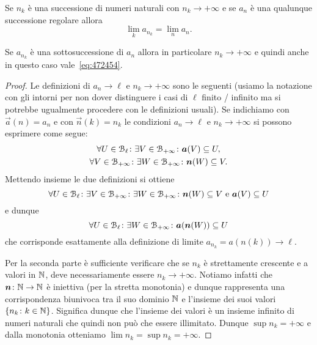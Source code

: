 \begin{theorem}
Se $n_k$ è una successione di numeri naturali con $n_k\to +\infty$
e se $a_n$ è una qualunque successione regolare
allora
\begin{equation}\label{eq:472454}
  \lim_k a_{n_k} = \lim_n a_n.
\end{equation}

Se $a_{n_k}$ è una sottosuccessione di $a_n$ allora in particolare $n_k\to +\infty$
e quindi anche in questo caso vale~\eqref{eq:472454}.
\end{theorem}
%
\begin{proof}
Le definizioni di $a_n \to \ell$ e $n_k \to +\infty$ sono le seguenti
(usiamo la notazione con gli intorni per non dover distinguere
i casi di $\ell$ finito / infinito ma si potrebbe ugualmente
procedere con le definizioni usuali).
Se indichiamo con $\vec a(n)=a_n$ e con $\vec n(k)=n_k$
le condizioni  $a_n\to \ell$ e $n_k\to +\infty$ si possono
esprimere come segue:
\begin{gather*}
 \forall U \in \mathcal B_\ell \colon \exists V \in \mathcal B_{+\infty} \colon
  \boldsymbol a (V) \subseteq U,\\
 \forall V \in \mathcal B_{+\infty} \colon \exists W \in \mathcal B_{+\infty} \colon
  \boldsymbol n(W) \subseteq V.
\end{gather*}
Mettendo insieme le due definizioni si ottiene
\[
  \forall U \in \mathcal B_\ell \colon
  \exists V \in \mathcal B_{+\infty} \colon
  \exists W \in \mathcal B_{+\infty} \colon
  \boldsymbol n(W) \subseteq V \text{ e }
  \boldsymbol a(V) \subseteq U
\]
e dunque
\[
  \forall U \in \mathcal B_\ell \colon \exists W \in \mathcal B_{+\infty} \colon
  \boldsymbol a(\boldsymbol n(W)) \subseteq U
\]
che corrisponde esattamente alla definizione di limite $a_{n_k} = a(n(k)) \to \ell$.

Per la seconda parte è sufficiente verificare che se $n_k$
è strettamente crescente
e a valori in $\mathbb N$, deve necessariamente essere $n_k\to +\infty$.
Notiamo infatti che $\boldsymbol n\colon \mathbb N\to \mathbb N$
è iniettiva (per la stretta monotonia) e dunque rappresenta una
corrispondenza biunivoca tra il suo dominio $\mathbb N$ e l'insieme dei
suoi valori ${\left\{ n_k \colon k \in \mathbb N \right\}}$. Significa dunque che l'insieme
dei valori è un insieme infinito di numeri naturali che quindi non può che
essere illimitato. Dunque $\sup n_k = +\infty$ e dalla monotonia
otteniamo $\lim n_k = \sup n_k = +\infty$.
\end{proof}



